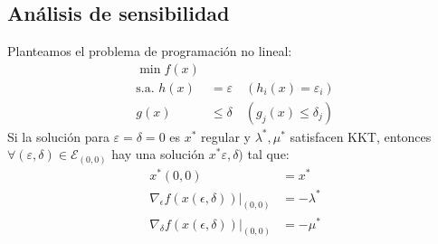 \documentclass{myclass}
\begin{document}
\subsection{Análisis de sensibilidad}
Planteamos el problema de programación no lineal:
\begin{align*}
  \min f(x) & \\
  \text{s.a.  } h(x) &= \varepsilon \quad (h_i(x) = \varepsilon_i) \\
  g(x) &\le \delta \quad (g_j(x)\le  \delta_j)
\end{align*}
Si la solución para $\varepsilon = \delta = 0$ es  $x^*$ regular y  $\lambda^*, \mu^*$ satisfacen KKT, entonces $\forall (\varepsilon, \delta) \in \mathcal{E}_{(0, 0)}$ hay una solución $x^*\varepsilon, \delta)$ tal que:
\begin{align*}
  x^*(0, 0) &= x^* \\
  \nabla _\epsilon f(x(\epsilon, \delta))|_{(0, 0)} &= -\lambda^* \\
  \nabla _\delta f(x(\epsilon, \delta))|_{(0,0)} &= -\mu^*
\end{align*}
\end{document}
